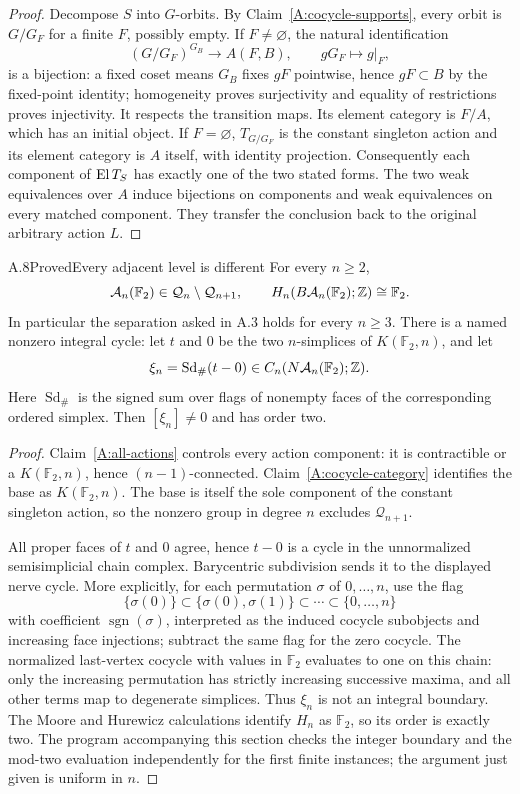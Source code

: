 \begin{proof}
Decompose $S$ into $G$-orbits. By Claim~\ref{A:cocycle-supports}, every orbit is $G/G_F$ for a finite $F$, possibly empty. If $F\ne\varnothing$, the natural identification
\[
 (G/G_F)^{G_B}\longrightarrow A(F,B),\qquad gG_F\longmapsto g|_F,
\]
is a bijection: a fixed coset means $G_B$ fixes $gF$ pointwise, hence $gF\subset B$ by the fixed-point identity; homogeneity proves surjectivity and equality of restrictions proves injectivity. It respects the transition maps. Its element category is $F/A$, which has an initial object. If $F=\varnothing$, $T_{G/G_F}$ is the constant singleton action and its element category is $A$ itself, with identity projection. Consequently each component of $\operatorname{El} T_S$ has exactly one of the two stated forms. The two weak equivalences over $A$ induce bijections on components and weak equivalences on every matched component. They transfer the conclusion back to the original arbitrary action $L$.
\end{proof}

\begin{claim}{A.8}{Proved}{Every adjacent level is different}\label{A:strict-tower}
For every $n\geq2$,
\[
 \mathcal A_n(\mathbb F_2)\in\mathcal Q_n\setminus\mathcal Q_{n+1},
 \qquad H_n(B\mathcal A_n(\mathbb F_2);\mathbb Z)\cong\mathbb F_2.
\]
In particular the separation asked in A.3 holds for every $n\geq3$.
There is a named nonzero integral cycle: let $t$ and $0$ be the two $n$-simplices of $K(\mathbb F_2,n)$, and let
\[
 \xi_n=\operatorname{Sd}_{\#}(t-0)\in C_n(N\mathcal A_n(\mathbb F_2);\mathbb Z).
\]
Here $\operatorname{Sd}_{\#}$ is the signed sum over flags of nonempty faces of the corresponding ordered simplex. Then $[\xi_n]\ne0$ and has order two.
\end{claim}
\begin{proof}
Claim~\ref{A:all-actions} controls every action component: it is contractible or a $K(\mathbb F_2,n)$, hence $(n-1)$-connected. Claim~\ref{A:cocycle-category} identifies the base as $K(\mathbb F_2,n)$. The base is itself the sole component of the constant singleton action, so the nonzero group in degree $n$ excludes $\mathcal Q_{n+1}$.

All proper faces of $t$ and $0$ agree, hence $t-0$ is a cycle in the unnormalized semisimplicial chain complex. Barycentric subdivision sends it to the displayed nerve cycle. More explicitly, for each permutation $\sigma$ of $0,\ldots,n$, use the flag
\[
 \{\sigma(0)\}\subset\{\sigma(0),\sigma(1)\}\subset\cdots\subset\{0,\ldots,n\}
\]
with coefficient $\operatorname{sgn}(\sigma)$, interpreted as the induced cocycle subobjects and increasing face injections; subtract the same flag for the zero cocycle. The normalized last-vertex cocycle with values in $\mathbb F_2$ evaluates to one on this chain: only the increasing permutation has strictly increasing successive maxima, and all other terms map to degenerate simplices. Thus $\xi_n$ is not an integral boundary. The Moore and Hurewicz calculations identify $H_n$ as $\mathbb F_2$, so its order is exactly two. The program accompanying this section checks the integer boundary and the mod-two evaluation independently for the first finite instances; the argument just given is uniform in $n$.
\end{proof}

